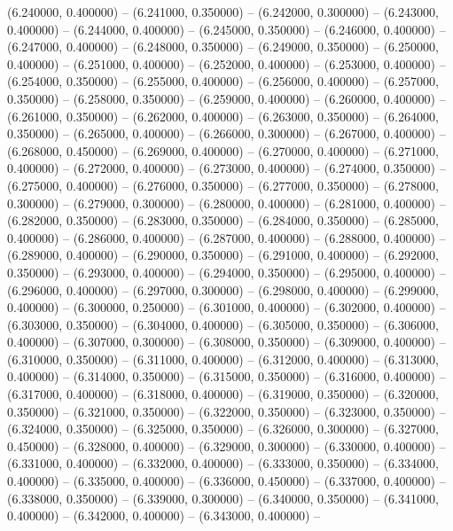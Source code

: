 (6.240000, 0.400000) -- 
(6.241000, 0.350000) -- 
(6.242000, 0.300000) -- 
(6.243000, 0.400000) -- 
(6.244000, 0.400000) -- 
(6.245000, 0.350000) -- 
(6.246000, 0.400000) -- 
(6.247000, 0.400000) -- 
(6.248000, 0.350000) -- 
(6.249000, 0.350000) -- 
(6.250000, 0.400000) -- 
(6.251000, 0.400000) -- 
(6.252000, 0.400000) -- 
(6.253000, 0.400000) -- 
(6.254000, 0.350000) -- 
(6.255000, 0.400000) -- 
(6.256000, 0.400000) -- 
(6.257000, 0.350000) -- 
(6.258000, 0.350000) -- 
(6.259000, 0.400000) -- 
(6.260000, 0.400000) -- 
(6.261000, 0.350000) -- 
(6.262000, 0.400000) -- 
(6.263000, 0.350000) -- 
(6.264000, 0.350000) -- 
(6.265000, 0.400000) -- 
(6.266000, 0.300000) -- 
(6.267000, 0.400000) -- 
(6.268000, 0.450000) -- 
(6.269000, 0.400000) -- 
(6.270000, 0.400000) -- 
(6.271000, 0.400000) -- 
(6.272000, 0.400000) -- 
(6.273000, 0.400000) -- 
(6.274000, 0.350000) -- 
(6.275000, 0.400000) -- 
(6.276000, 0.350000) -- 
(6.277000, 0.350000) -- 
(6.278000, 0.300000) -- 
(6.279000, 0.300000) -- 
(6.280000, 0.400000) -- 
(6.281000, 0.400000) -- 
(6.282000, 0.350000) -- 
(6.283000, 0.350000) -- 
(6.284000, 0.350000) -- 
(6.285000, 0.400000) -- 
(6.286000, 0.400000) -- 
(6.287000, 0.400000) -- 
(6.288000, 0.400000) -- 
(6.289000, 0.400000) -- 
(6.290000, 0.350000) -- 
(6.291000, 0.400000) -- 
(6.292000, 0.350000) -- 
(6.293000, 0.400000) -- 
(6.294000, 0.350000) -- 
(6.295000, 0.400000) -- 
(6.296000, 0.400000) -- 
(6.297000, 0.300000) -- 
(6.298000, 0.400000) -- 
(6.299000, 0.400000) -- 
(6.300000, 0.250000) -- 
(6.301000, 0.400000) -- 
(6.302000, 0.400000) -- 
(6.303000, 0.350000) -- 
(6.304000, 0.400000) -- 
(6.305000, 0.350000) -- 
(6.306000, 0.400000) -- 
(6.307000, 0.300000) -- 
(6.308000, 0.350000) -- 
(6.309000, 0.400000) -- 
(6.310000, 0.350000) -- 
(6.311000, 0.400000) -- 
(6.312000, 0.400000) -- 
(6.313000, 0.400000) -- 
(6.314000, 0.350000) -- 
(6.315000, 0.350000) -- 
(6.316000, 0.400000) -- 
(6.317000, 0.400000) -- 
(6.318000, 0.400000) -- 
(6.319000, 0.350000) -- 
(6.320000, 0.350000) -- 
(6.321000, 0.350000) -- 
(6.322000, 0.350000) -- 
(6.323000, 0.350000) -- 
(6.324000, 0.350000) -- 
(6.325000, 0.350000) -- 
(6.326000, 0.300000) -- 
(6.327000, 0.450000) -- 
(6.328000, 0.400000) -- 
(6.329000, 0.300000) -- 
(6.330000, 0.400000) -- 
(6.331000, 0.400000) -- 
(6.332000, 0.400000) -- 
(6.333000, 0.350000) -- 
(6.334000, 0.400000) -- 
(6.335000, 0.400000) -- 
(6.336000, 0.450000) -- 
(6.337000, 0.400000) -- 
(6.338000, 0.350000) -- 
(6.339000, 0.300000) -- 
(6.340000, 0.350000) -- 
(6.341000, 0.400000) -- 
(6.342000, 0.400000) -- 
(6.343000, 0.400000) -- 
